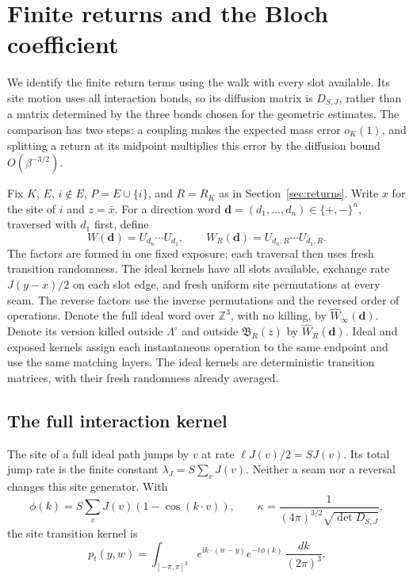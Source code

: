 \section{Finite returns and the Bloch coefficient}\label{sec:ideal}

We identify the finite return terms using the walk with every slot
available. Its site motion uses all interaction bonds, so its diffusion
matrix is \(D_{S,J}\), rather than a matrix determined by the three
bonds chosen for the geometric estimates. The comparison has two steps:
a coupling makes the expected mass error \(o_K(1)\), and splitting a
return at its midpoint multiplies this error by the diffusion bound
\(O(\beta^{-3/2})\).

Fix \(K\), \(E\), \(i\notin E\), \(P=E\cup\{i\}\), and
\(R=R_K\) as in Section~\ref{sec:returns}. Write \(x\) for the site
of \(i\) and \(z=\bar x\). For a direction word
\(\mathbf d=(d_1,\ldots,d_n)\in\{+,-\}^n\), traversed with
\(d_1\) first, define
\[
 W(\mathbf d)=U_{d_n}\cdots U_{d_1},\qquad
 W_R(\mathbf d)=U_{d_n,R}\cdots U_{d_1,R}.
\]
The factors are formed in one fixed exposure; each traversal then uses
fresh transition randomness. The ideal kernels have all slots available,
exchange rate \(J(y-x)/2\) on each slot edge, and fresh uniform site
permutations at every seam. The reverse factors use the inverse
permutations and the reversed order of operations. Denote the full
ideal word over \(\mathbb Z^3\), with no killing, by
\(\widehat W_\infty(\mathbf d)\). Denote its version killed outside
\(\Lambda^\circ\) and outside \(\mathfrak B_R(z)\) by
\(\widehat W_R(\mathbf d)\). Ideal and exposed kernels assign each
instantaneous operation to the same endpoint and use the same matching
layers. The ideal kernels are deterministic transition matrices, with
their fresh randomness already averaged.

\subsection{The full interaction kernel}

The site of a full ideal path jumps by \(v\) at rate
\(\ell J(v)/2=SJ(v)\). Its total jump rate is the finite constant
\(\lambda_J=S\sum_vJ(v)\). Neither a seam nor a reversal changes
this site generator. With
\[
 \phi(k)=S\sum_vJ(v)(1-\cos(k\cdot v)),\qquad
 \kappa=\frac1{(4\pi)^{3/2}\sqrt{\det D_{S,J}}},
\]
the site transition kernel is
\begin{equation}\label{eq:ideal-fourier}
 p_t(y,w)=\int_{[-\pi,\pi]^3}
     e^{\mathrm i k\cdot(w-y)}e^{-t\phi(k)}\,
                         \frac{dk}{(2\pi)^3}.
\end{equation}

